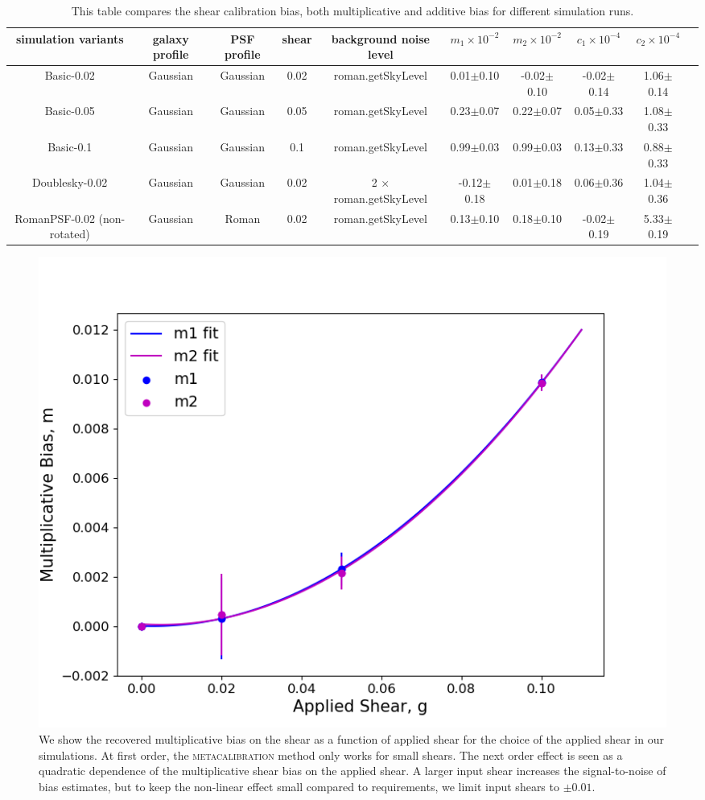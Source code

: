 \documentclass[fleqn,usenatbib]{mnras}
\begin{document}
\begin{table}
	\centering
	\label{tab:simple_sim}
	\begin{tabular}[width=\textwidth]{ c|c|c|c|c|c|c|c|c|c } 
		\hline
		simulation variants & galaxy profile & PSF profile & shear & background noise level & $m_{1}\times10^{-2}$ & $m_{2}\times10^{-2}$ & $c_{1}\times10^{-4}$ & $c_{2}\times10^{-4}$\\
		\hline
		Basic-0.02 & Gaussian & Gaussian & 0.02 & roman.getSkyLevel & 0.01$\pm$0.10 & -0.02$\pm$0.10 & -0.02$\pm$0.14 & 1.06$\pm$0.14\\
		Basic-0.05 & Gaussian & Gaussian & 0.05 & roman.getSkyLevel & 0.23$\pm$0.07 & 0.22$\pm$0.07 & 0.05$\pm$0.33 & 1.08$\pm$0.33\\
		Basic-0.1 & Gaussian & Gaussian & 0.1 & roman.getSkyLevel & 0.99$\pm$0.03 & 0.99$\pm$0.03 & 0.13$\pm$0.33 & 0.88$\pm$0.33\\
		\hline
		Doublesky-0.02 & Gaussian & Gaussian & 0.02 & 2 $\times$ roman.getSkyLevel & -0.12$\pm$0.18 & 0.01$\pm$0.18 & 0.06$\pm$0.36 & 1.04$\pm$0.36\\
		\hline
		RomanPSF-0.02 (non-rotated) & Gaussian & Roman & 0.02 & roman.getSkyLevel & 0.13$\pm$0.10 & 0.18$\pm$0.10 & -0.02$\pm$0.19 & 5.33$\pm$0.19\\
		\hline
	\end{tabular}
	\caption{This table compares the shear calibration bias, both multiplicative and additive bias for different simulation runs.}
	\label{tab:result}
\end{table}

\begin{figure}
	\includegraphics[width=\columnwidth]{metacal_bias_shear.png}
    \caption{We show the recovered multiplicative bias on the shear as a function of applied shear for the choice of the applied shear in our simulations. At first order, the \textsc{metacalibration} method only works for small shears. The next order effect is seen as a quadratic dependence of the multiplicative shear bias on the applied shear. A larger input shear increases the signal-to-noise of bias estimates, but to keep the non-linear effect small compared to requirements, we limit input shears to $\pm 0.01$.}
    \label{fig:metacal_shear_linear}
\end{figure}
\end{document}

